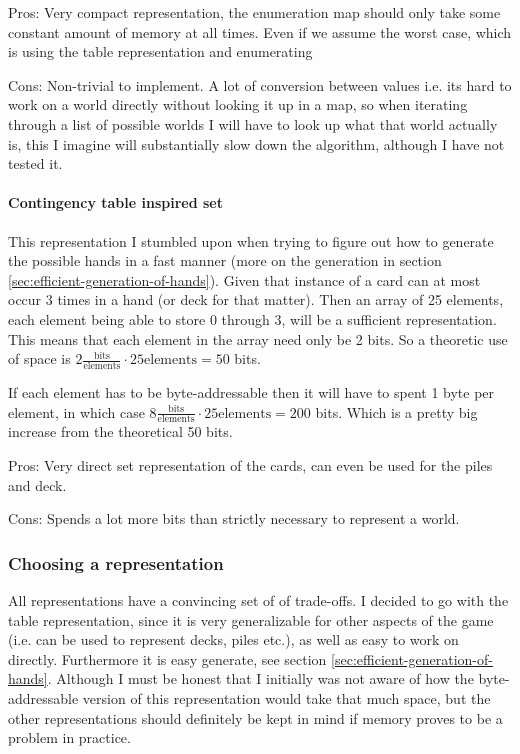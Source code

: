 Pros: Very compact representation, the enumeration map should only take some constant amount of memory at all times. Even if we assume the worst case, which is using the table representation and enumerating

Cons: Non-trivial to implement. A lot of conversion between values i.e. its hard to work on a world directly without looking it up in a map, so when iterating through a list of possible worlds I will have to look up what that world actually is, this I imagine will substantially slow down the algorithm, although I have not tested it.

\paragraph{Contingency table inspired set}
This representation I stumbled upon when trying to figure out how to generate the possible hands in a fast manner (more on the generation in section \ref{sec:efficient-generation-of-hands}).
Given that instance of a card can at most occur 3 times in a hand (or deck for that matter). Then an array of 25 elements, each element being able to store 0 through 3, will be a sufficient representation. This means that each element in the array need only be 2 bits. So a theoretic use of space is $2 \frac{\text{bits}}{\text{elements}} \cdot 25\text{elements} = 50$ bits. 

If each element has to be byte-addressable then it will have to spent 1 byte per element, in which case $8 \frac{\text{bits}}{\text{elements}} \cdot 25\text{elements} = 200$ bits. Which is a pretty big increase from the theoretical 50 bits.  

Pros: Very direct set representation of the cards, can even be used for the piles and deck. 

Cons: Spends a lot more bits than strictly necessary to represent a world.


\subsubsection{Choosing a representation}
All representations have a convincing set of of trade-offs. I decided to go with the table representation, since it is very generalizable for other aspects of the game (i.e. can be used to represent decks, piles etc.), as well as easy to work on directly. Furthermore it is easy generate, see section \ref{sec:efficient-generation-of-hands}. Although I must be honest that I initially was not aware of how the byte-addressable version of this representation would take that much space, but the other representations should definitely be kept in mind if memory proves to be a problem in practice.


